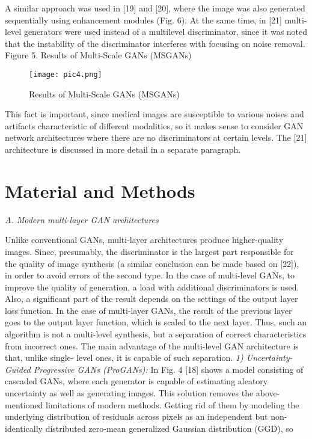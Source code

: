 \documentclass[10pt, a4paper]{article}
\begin{document}
\begin{multicols}{2}
A similar approach was used in [19] and [20], where the image was also generated sequentially using enhancement modules (Fig. 6). At the same time, in [21] multi-level generators were used instead of a multilevel discriminator, since it was noted that the instability of the discriminator interferes with focusing on noise removal.
Figure 5. Results of Multi-Scale GANs (MSGANs)
\begin{figure}[H]
    \flushright
    \texttt{[image: pic4.png]}
    \caption{Results of Multi-Scale GANs (MSGANs)}
    \label{fig:pic4.png}
\end{figure}
\fontsize{10}{14}\selectfont
\noindent
This fact is important, since medical images are susceptible to various noises and artifacts characteristic of different modalities, so it makes sense to consider GAN network architectures where there are no discriminators at certain levels. The [21] architecture is discussed in more detail in a separate paragraph.
\vspace{-0.15cm}
\section{Material and Methods}
\noindent
\textit{A. Modern multi-layer GAN architectures}
\vspace{0.2cm}

Unlike conventional GANs, multi-layer architectures produce higher-quality images. Since, presumably, the discriminator is the largest part responsible for the quality of image synthesis (a similar conclusion can be made based on [22]), in order to avoid errors of the second type. In the case of multi-level GANs, to improve the quality of generation, a load with additional discriminators is used. Also, a significant part of the result depends on the settings of the output layer loss function. In the case of multi-layer GANs, the result of the previous layer goes to the output layer function, which is scaled to the next layer. Thus, such an algorithm is not a multi-level synthesis, but a separation of correct characteristics from incorrect ones. The main advantage of the multi-level GAN architecture is that, unlike single- level ones, it is capable of such separation.
\textit{1) Uncertainty-Guided Progressive GANs (ProGANs):}
In Fig. 4 [18] shows a model consisting of cascaded GANs, where each generator is capable of estimating aleatory uncertainty as well as generating images. This solution removes the above-mentioned limitations of modern methods. Getting rid of them by modeling the underlying distribution of residuals across pixels as an independent but non-identically distributed zero-mean generalized Gaussian distribution (GGD), so
\begin{multline}
    

\end{multline}
\end{multicols}
\end{document}
